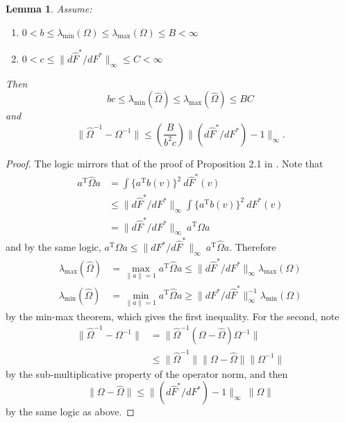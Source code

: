\documentclass[11pt,twoside]{article}
\def\T{{ \mathrm{\scriptscriptstyle T} }}
\newtheorem{applemma}{Lemma}
\theoremstyle{definition}
\theoremstyle{remark}
\begin{document}
\bigskip


\begin{applemma} \label{lem:eigen}
Assume:
\begin{enumerate}
\item $0 < b \leq \lambda_{\min}(\Omega) \leq \lambda_{\max}(\Omega) \leq B < \infty$
\item $0 < c \leq \| d \widehat{F}^*/dF^* \|_\infty \leq C < \infty$
\end{enumerate} 
Then
$$ bc \leq \lambda_{\min}(\widehat\Omega) \leq \lambda_{\max}(\widehat\Omega) \leq BC  $$
and
$$ \| \widehat\Omega^{-1} - \Omega^{-1} \| \leq  \left( \frac{ B }{b^2 c} \right)  \| (d\widehat{F}^*/dF^*) - 1 \|_\infty . $$
\end{applemma}

\bigskip

\begin{proof}
The logic mirrors that of the proof of Proposition 2.1 in  \citet{belloni2015some}. Note that
\begin{align*}
a^\T \widehat\Omega a &=  \int \Big\{ a^\T b(v) \Big\}^2 \ d\widehat{F}^*(v) \\
& \leq \| d\widehat{F}^*/dF^* \|_\infty  \int \Big\{ a^\T b(v) \Big\}^2  \ d{F}^*(v) \\
&= \| d\widehat{F}^*/dF^* \|_\infty \ a^\T \Omega a
\end{align*}
and by the same logic, $a^\T \Omega a \leq \| dF^*/d\widehat{F}^* \|_\infty \ a^\T \widehat\Omega a$. Therefore 
\begin{align*}
\lambda_{\max}( \widehat\Omega) &= \max_{\|a \|=1} a^\T \widehat\Omega a \leq  \| d\widehat{F}^*/dF^* \|_\infty \lambda_{\max}(\Omega) \\
\lambda_{\min}( \widehat\Omega) &=  \min_{\|a \|=1} a^\T \widehat\Omega a \geq \| dF^*/d\widehat{F}^* \|_\infty^{-1} \lambda_{\min}(\Omega)
\end{align*}
by the min-max theorem, which gives the first inequality.
For the second, note
\begin{align*}
 \| \widehat\Omega^{-1} - \Omega^{-1} \| &=  \| \widehat\Omega^{-1} (\Omega -\widehat\Omega ) \Omega^{-1} \| \\
 &\leq \| \widehat\Omega^{-1} \| \| \Omega -\widehat\Omega \| \| \Omega^{-1} \|
\end{align*}
by the sub-multiplicative property of the operator norm, and then
$$ \| \Omega -\widehat\Omega \|  \leq \| (d\widehat{F}^*/dF^*) - 1 \|_\infty \ \| \Omega \|  $$
by the same logic as above. 
\end{proof}
\end{document}
